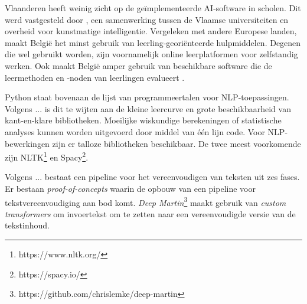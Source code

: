 Vlaanderen heeft weinig zicht op de geïmplementeerde AI-software in scholen. Dit werd vastgesteld door \autocite{Martens2021}, een samenwerking tussen de Vlaamse universiteiten en overheid voor kunstmatige intelligentie. Vergeleken met andere Europese landen, maakt België het minst gebruik van leerling-georiënteerde hulpmiddelen. Degenen die wel gebruikt worden, zijn voornamelijk online leerplatformen voor zelfstandig werken. Ook maakt België amper gebruik van beschikbare software die de leermethoden en -noden van leerlingen evalueert \autocite{Martens2021a}. 



Python staat bovenaan de lijst van programmeertalen voor NLP-toepassingen. Volgens ... is dit te wijten aan de kleine leercurve en grote beschikbaarheid van kant-en-klare bibliotheken. Moeilijke wiskundige berekeningen of statistische analyses kunnen worden uitgevoerd door middel van één lijn code. Voor NLP-bewerkingen zijn er talloze bibliotheken beschikbaar. De twee meest voorkomende zijn NLTK\footnote{https://www.nltk.org/} en Spacy\footnote{https://spacy.io/}.

Volgens ... bestaat een pipeline voor het vereenvoudigen van teksten uit zes fases. Er bestaan \textit{proof-of-concepts} waarin de opbouw van een pipeline voor tekstvereenvoudiging aan bod komt. \textit{Deep Martin}\footnote{https://github.com/chrislemke/deep-martin} maakt gebruik van \textit{custom transformers} om invoertekst om te zetten naar een vereenvoudigde versie van de tekstinhoud.

